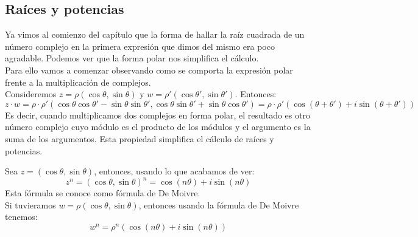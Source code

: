 \subsection{Ra\'ices y potencias}

    Ya vimos al comienzo del capítulo que la forma de hallar la raíz cuadrada de un número complejo en la primera expresión que dimos del mismo era poco agradable. Podemos ver que la forma polar nos simplifica el cálculo.\\
    Para ello vamos a comenzar observando como se comporta la expresión polar frente a la multiplicación de complejos.\\

    Consideremos $z = \rho(\cos \theta, \sin \theta)$ y $w = \rho'(\cos \theta', \sin \theta')$. Entonces:
    $$
        z \cdot w = \rho \cdot \rho' (\cos \theta \cos \theta' - \sin \theta \sin \theta', \cos\theta \sin \theta' + \sin \theta \cos \theta') = \rho \cdot \rho' (\cos (\theta + \theta') + i\sin(\theta+\theta'))
    $$
    Es decir, cuando multiplicamos dos complejos en forma polar, el resultado es otro número complejo cuyo módulo es el producto de los módulos y el argumento es la suma de los argumentos. Esta propiedad simplifica el cálculo de raíces y potencias.

    \begin{eg}
        Sea $z = (\cos \theta, \sin \theta)$, entonces, usando lo que acabamos de ver:
        $$
            z^n = (\cos \theta, \sin \theta)^n = \cos(n\theta) + i \sin(n\theta)
        $$
        Esta fórmula se conoce como fórmula de De Moivre.\\
        Si tuvieramos $w = \rho(\cos \theta, \sin \theta)$, entonces usando la fórmula de De Moivre tenemos:
        $$
            w^n = \rho^n (\cos(n\theta) + i\sin(n\theta))
        $$
    \end{eg}

